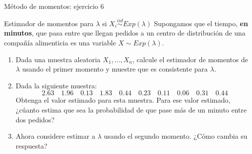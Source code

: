 \documentclass{beamer}
\theoremstyle{definition}
\begin{document}
\begin{frame}{\color{rosee}Método de momentos: ejercicio 6}\small
  \begin{exampleblock}{Estimador de momentos para $\lambda$ si $X_i\stackrel{iid}{\sim} Exp(\lambda)$}
    Supongamos que el tiempo, \textbf{en minutos}, que pasa entre que llegan
    pedidos a un centro de distribuci\'on de una compa\~n\'ia
    alimenticia es una variable $X\sim Exp(\lambda)$.
    
    \begin{enumerate}
    \item Dada una muestra aleatoria $X_{1},\dots,X_{n}$,
      calcule el estimador de momentos de $\lambda$ usando el primer momento y muestre que es
      consistente para $\lambda$.
    \item Dada la siguiente muestra:
      \[ 2.63\quad 1.96\quad 0.13\quad 1.83\quad 0.44\quad 0.23\quad
      0.11\quad 0.06\quad 0.31\quad 0.44\]
      Obtenga el valor estimado para esta muestra. Para ese valor
      estimado, ¿c\'uanto estima que sea la probabilidad de que pase m\'as de un
      minuto entre dos pedidos?
      \item Ahora considere estimar a $\lambda$ usando el segundo momento. ¿Cómo cambia su respuesta? 
    \end{enumerate}
  \end{exampleblock}
\end{frame}


\end{document}
